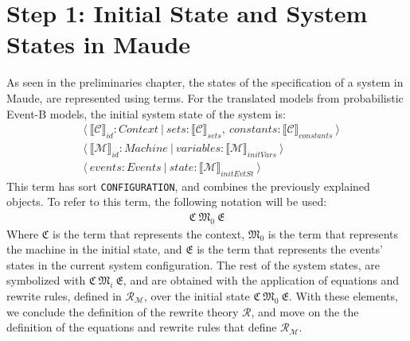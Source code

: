 \section{Step 1: Initial State and System States in Maude}
As seen in the preliminaries chapter, the states of the specification of a system in Maude, are represented using terms. For the translated models from probabilistic Event-B models, the initial system state of the system is:
\begin{align*}
        &\langle \ \llbracket \mathscr{C} \rrbracket_{id} : Context \ | \ sets: \llbracket \mathscr{C} \rrbracket_{sets} , \ constants: \llbracket \mathscr{C} \rrbracket_{constants} \ \rangle \\
        & \langle \ \llbracket \mathscr{M} \rrbracket_{id} : Machine \ | \ variables: \llbracket \mathscr{M} \rrbracket_{initVars} \ \rangle \\
        & \langle \ events : Events \ | \ state :  \llbracket \mathscr{M} \rrbracket_{initEvtSt}  \ \rangle
\end{align*}
This term has sort \texttt{CONFIGURATION}, and combines the previously explained objects. To refer to this term, the following notation will be used:
    \begin{align*}
        \mathfrak{C} \ \mathfrak{M}_{0}  \ \mathfrak{E}
    \end{align*}
Where $\mathfrak{C}$ is the term that represents the context, $\mathfrak{M}_{0}$ is the term that represents the machine in the initial state, and $\mathfrak{E}$ is the term that represents the events' states in the current system configuration. The rest of the system states, are symbolized with $\mathfrak{C} \ \mathfrak{M}_{i}  \ \mathfrak{E}$, and are obtained with the application of equations and rewrite rules, defined in $\mathscr{R}_\mathscr{M}$,  over the initial state $\mathfrak{C} \ \mathfrak{M}_{0}  \ \mathfrak{E}$. With these elements, we conclude the definition of the rewrite theory $\mathscr{R}$, and move on the the definition of the equations and rewrite rules that define $\mathscr{R}_\mathscr{M}$.

